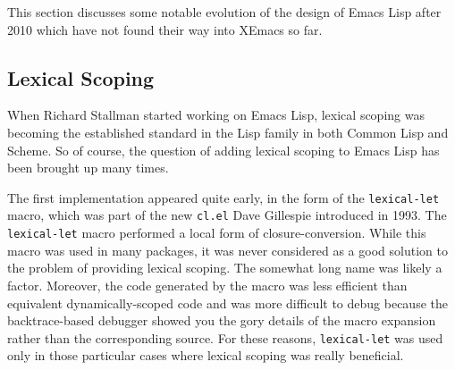 \documentclass[format=acmsmall,screen]{acmart}
\newcommand \Elisp {Emacs Lisp}
\begin{document}
This section discusses some notable evolution of the design of
\Elisp{} after 2010 which have not found their way into XEmacs so far.

\subsection{Lexical Scoping}
\label{sec:lexical-scoping}

When Richard Stallman started working on \Elisp, lexical scoping
was becoming the established standard in the Lisp family in both
Common Lisp and Scheme.  So of course, the question of adding lexical
scoping to \Elisp{} has been brought up many times.

The first implementation appeared quite early, in the form of the
\texttt{lexical-let} macro, which was part of the new \texttt{cl.el} Dave
Gillespie %
introduced in 1993.
The \texttt{lexical-let} macro performed a local form of closure-conversion.
While this macro was used in many packages, it was never considered as
a good solution to the problem of providing lexical scoping.
The somewhat long name was likely a factor.
Moreover, the code generated by the macro was less efficient than
equivalent dynamically-scoped code and was more difficult to debug because
the backtrace-based debugger showed you the gory details of the
macro expansion rather than the corresponding source.  For these reasons,
\texttt{lexical-let} was used only in those particular cases where lexical
scoping was really beneficial.
\end{document}
